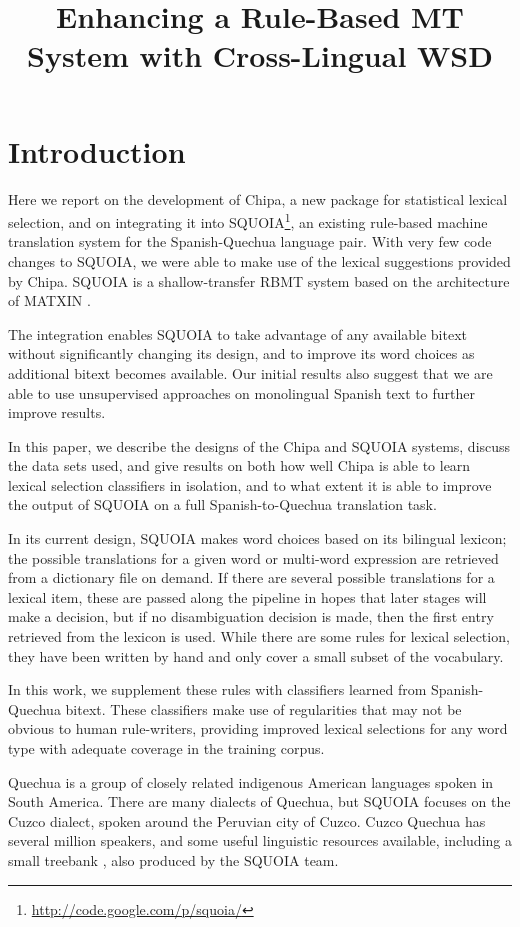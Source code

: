 \documentclass[10pt, a4paper]{article}
\title{Enhancing a Rule-Based MT System with Cross-Lingual WSD}
\begin{document}
\maketitleabstract

\section{Introduction}
Here we report on the development of Chipa, a new package for statistical
lexical selection, and on integrating it into
SQUOIA\footnote{\url{http://code.google.com/p/squoia/}}, an existing rule-based
machine translation system for the Spanish-Quechua language pair.  With very
few code changes to SQUOIA, we were able to make use of the lexical suggestions
provided by Chipa. SQUOIA is a shallow-transfer RBMT system based on the
architecture of MATXIN \cite{matxin_2005,matxin}.

The integration enables SQUOIA to take advantage of any available bitext
without significantly changing its design, and to improve its word choices as
additional bitext becomes available. Our initial results also suggest that we
are able to use unsupervised approaches on monolingual Spanish text to further
improve results.

In this paper, we describe the designs of the Chipa and SQUOIA systems, discuss
the data sets used, and give results on both how well Chipa is able to learn
lexical selection classifiers in isolation, and to what extent it is able to
improve the output of SQUOIA on a full Spanish-to-Quechua translation task.

In its current design, SQUOIA makes word choices based on its bilingual
lexicon; the possible translations for a given word or multi-word expression
are retrieved from a dictionary file on demand. If there are several possible
translations for a lexical item, these are passed along the pipeline in hopes
that later stages will make a decision, but if no disambiguation decision is
made, then the first entry retrieved from the lexicon is used. While there are
some rules for lexical selection, they have been written by hand and only cover
a small subset of the vocabulary.

In this work, we supplement these rules with classifiers learned from
Spanish-Quechua bitext. These classifiers make use of regularities that may not
be obvious to human rule-writers, providing improved lexical selections for
any word type with adequate coverage in the training corpus.

Quechua is a group of closely related indigenous American languages spoken in
South America. There are many dialects of Quechua, but SQUOIA focuses on the
Cuzco dialect, spoken around the Peruvian city of Cuzco.  Cuzco Quechua has
several million speakers, and some useful linguistic resources available,
including a small treebank \cite{rios2009quechua}, also produced by the SQUOIA
team.
\end{document}
